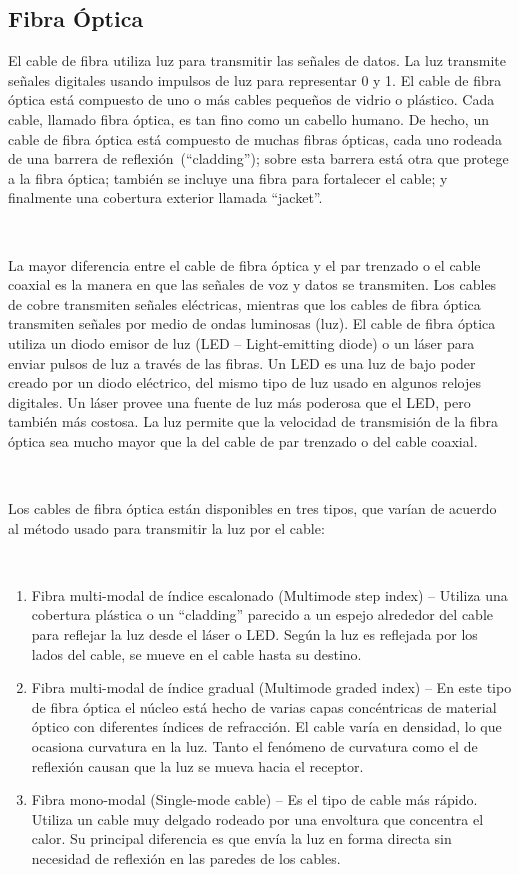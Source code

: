 \documentclass[a4paper]{article}
\begin{document}
\subsection{Fibra \'Optica}

El cable de fibra utiliza luz para transmitir las señales de datos. La
luz transmite señales digitales usando impulsos de luz para representar
0 y 1. El cable de fibra óptica está compuesto de uno o más cables
pequeños de vidrio o plástico. Cada cable, llamado fibra óptica, es tan
fino como un cabello humano. De hecho, un cable de fibra óptica está
compuesto de muchas fibras ópticas, cada uno rodeada de una barrera de
reflexión~(``cladding''); sobre esta barrera está otra que protege a la
fibra óptica; también se incluye una fibra para fortalecer el cable; y
finalmente una cobertura exterior llamada ``jacket''.

~

La mayor diferencia entre el cable de fibra óptica y el par trenzado o
el cable coaxial es la manera en que las señales de voz y datos se
transmiten. Los cables de cobre transmiten señales eléctricas, mientras
que los cables de fibra óptica transmiten señales por medio de ondas
luminosas (luz). El cable de fibra óptica utiliza un diodo emisor de luz
(LED -- Light-emitting diode) o un láser para enviar pulsos de luz a
través de las fibras. Un LED es una luz de bajo poder creado por un
diodo eléctrico, del mismo tipo de luz usado en algunos relojes
digitales. Un láser provee una fuente de luz más poderosa que el LED,
pero también más costosa. La luz permite que la velocidad de transmisión
de la fibra óptica sea mucho mayor que la del cable de par trenzado o
del cable coaxial.

~

Los cables de fibra óptica están disponibles en tres tipos, que varían
de acuerdo al método usado para transmitir la luz por el cable:

~

\begin{enumerate}
\def\labelenumi{\arabic{enumi}.}
\item
  Fibra multi-modal de índice escalonado (Multimode step index) --
  Utiliza una cobertura plástica o un ``cladding'' parecido a un espejo
  alrededor del cable para reflejar la luz desde el láser o LED. Según
  la luz es reflejada por los lados del cable, se mueve en el cable
  hasta su destino.
\item
  Fibra multi-modal de índice gradual (Multimode graded index) -- En
  este tipo de fibra óptica el núcleo está hecho de varias capas
  concéntricas de material óptico con diferentes índices de refracción.
  El cable varía en densidad, lo que ocasiona curvatura en la luz. Tanto
  el fenómeno de curvatura como el de reflexión causan que la luz se
  mueva hacia el receptor.
\item
  Fibra mono-modal (Single-mode cable) -- Es el tipo de cable más
  rápido. Utiliza un cable muy delgado rodeado por una envoltura que
  concentra el calor. Su principal diferencia es que envía la luz en
  forma directa sin necesidad de reflexión en las paredes de los cables.
\end{enumerate}
\end{document}
